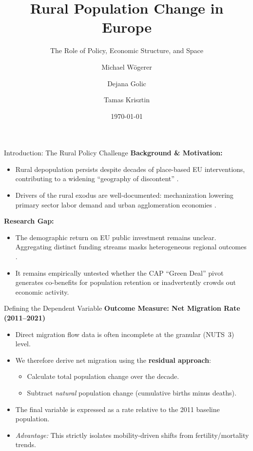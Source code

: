 \documentclass[aspectratio=169]{beamer}
\title[Rural Population Change]{Rural Population Change in Europe}
\subtitle{The Role of Policy, Economic Structure, and Space}
\author[W\"ogerer, Golic, Krisztin]{Michael W\"ogerer \and Dejana Golic \and Tamas Krisztin}
\institute[IIASA]{International Institute for Applied Systems Analysis (IIASA)}
\date{\today}
\begin{document}
\begin{frame}
    \titlepage
\end{frame}

\begin{frame}{Introduction: The Rural Policy Challenge}
    \textbf{Background \& Motivation:}
    \begin{itemize}
        \item Rural depopulation persists despite decades of place-based EU interventions, contributing to a widening ``geography of discontent'' \citep{RodriguezPose2018, McCann2019}. \pause
        \item Drivers of the rural exodus are well-documented: mechanization lowering primary sector labor demand \citep{Collantes2011} and urban agglomeration economies \citep{Glaeser2009, lichter2025depopulation}. \pause
    \end{itemize}
    \vspace{0.3cm}
    \textbf{Research Gap:}
    \begin{itemize}
        \item The demographic return on EU public investment remains unclear. Aggregating distinct funding streams masks heterogeneous regional outcomes \citep{RodriguezPose2004}. \pause
        \item It remains empirically untested whether the CAP ``Green Deal'' pivot generates co-benefits for population retention or inadvertently crowds out economic activity.
    \end{itemize}
\end{frame}

\begin{frame}{Defining the Dependent Variable}
    \textbf{Outcome Measure: Net Migration Rate (2011--2021)}
    \vspace{0.3cm}
    \begin{itemize}
        \item Direct migration flow data is often incomplete at the granular (NUTS~3) level.\pause
        \item We therefore derive net migration using the \textbf{residual approach}:\pause
        \begin{itemize}
            \item Calculate total population change over the decade.
            \item Subtract \textit{natural} population change (cumulative births minus deaths).
        \end{itemize}\pause
        \item The final variable is expressed as a rate relative to the 2011 baseline population.
        \item \textit{Advantage:} This strictly isolates mobility-driven shifts from fertility/mortality trends.
    \end{itemize}
\end{frame}
\end{document}
